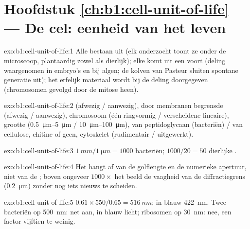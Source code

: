 \section*{Hoofdstuk \ref{ch:b1:cell-unit-of-life} --- De cel: eenheid van het leven}

\begin{solution}{exo:b1:cell-unit-of-life:1}
Alle  bestaan uit  (elk onderzocht  toont ze onder de
microscoop, plantaardig zowel als dierlijk); elke  komt uit een  voort
(deling waargenomen in embryo's en bij algen; de kolven van Pasteur sluiten
spontane generatie uit); het erfelijk materiaal wordt bij de deling doorgegeven
(chromosomen gevolgd door de mitose heen).
\end{solution}

\begin{solution}{exo:b1:cell-unit-of-life:2}
 (afwezig / aanwezig), door membranen begrensde  (afwezig /
aanwezig), chromosoom (één ringvormig / verscheidene lineaire), grootte
(\qtyrange{0.5}{5}{\micro m} / \qtyrange{10}{100}{\micro m}),  van
peptidoglycaan (bacteriën) / van cellulose, chitine of geen, cytoskelet
(rudimentair / uitgewerkt).
\end{solution}

\begin{solution}{exo:b1:cell-unit-of-life:3}
$\qty{1}{mm}/\qty{1}{\micro m} = 1000$ bacteriën; $1000/20 = 50$ dierlijke
.
\end{solution}

\begin{solution}{exo:b1:cell-unit-of-life:4}
Het  hangt af van de golflengte en de numerieke apertuur, niet
van de ; boven ongeveer $1000\times$  het beeld de vaagheid van
de diffractiegrens (\qty{0.2}{\micro m}) zonder nog iets nieuws te scheiden.
\end{solution}

\begin{solution}{exo:b1:cell-unit-of-life:5}
$0.61\times 550/0.65 = \qty{516}{nm}$; in blauw \qty{422}{nm}. Twee bacteriën op
\qty{500}{nm}: net aan, in blauw licht; ribosomen op \qty{30}{nm}: nee, een
factor vijftien te weinig.
\end{solution}

